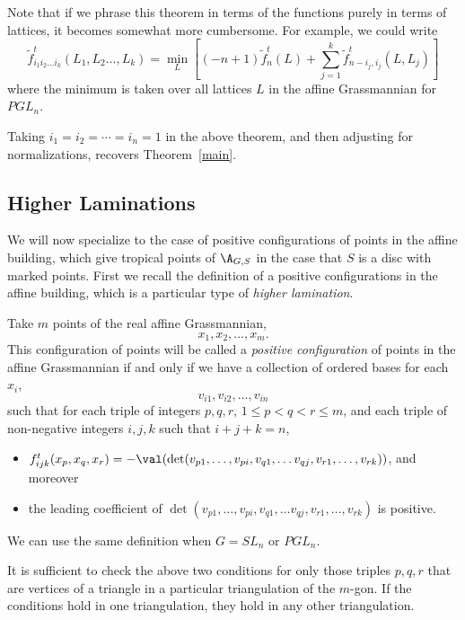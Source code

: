 \begin{rema} Note that if we phrase this theorem in terms of the functions purely in terms of lattices, it becomes somewhat more cumbersome. For example, we could write
\[
\tilde{f}^t_{i_1i_2\dots i_k}(L_1,L_2\dots,L_k) = \min_{L} \left[(-n+1)\tilde{f}_n^t(L) + \sum_{j=1}^k \tilde{f}^t_{n-i_j, i_j}(L,L_j) \right]
\]
where the minimum is taken over all lattices $L$ in the affine Grassmannian for $PGL_n$.
\end{rema}

\begin{rema} Taking $i_1=i_2=\cdots=i_n=1$ in the above theorem, and then adjusting for normalizations, recovers Theorem~\ref{main}.
\end{rema}

\subsection{Higher Laminations}

We will now specialize to the case of positive configurations of points in the affine building, which give tropical points of $\A_{G,S}$ in the case that $S$ is a disc with marked points. First we recall the definition of a positive configurations in the affine building, which is a particular type of \emph{higher lamination}.

\begin{definition} Take $m$ points of the real affine Grassmannian, 
\[
x_1, x_2, \dots, x_m.
\]
This configuration of points will be called a \emph{positive configuration} of points in the affine Grassmannian if and only if we have a collection of ordered bases for each $x_i$,
\[
v_{i1}, v_{i2}, \dots, v_{in}
\]
such that for each triple of integers $p, q, r$, $1 \leq p < q < r \leq m$, and each triple of non-negative integers $i, j, k$ such that $i+j+k=n$,
\begin{itemize}
\item $f_{ijk}^t (x_p,x_q,x_r) = -\val(\det(v_{p1}, \dots, v_{pi}, v_{q1}, \dots v_{qj}, v_{r1}, \dots, v_{rk}))$, and moreover
\item the leading coefficient of $\det(v_{p1}, \dots, v_{pi}, v_{q1}, \dots v_{qj}, v_{r1}, \dots, v_{rk})$ is positive.
\end{itemize}
\end{definition}

We can use the same definition when $G=SL_n$ or $PGL_n$.

\begin{rema} It is sufficient to check the above two conditions for only those triples $p, q, r$ that are vertices of a triangle in a particular triangulation of the $m$-gon. If the conditions hold in one triangulation, they hold in any other triangulation.
\end{rema}

